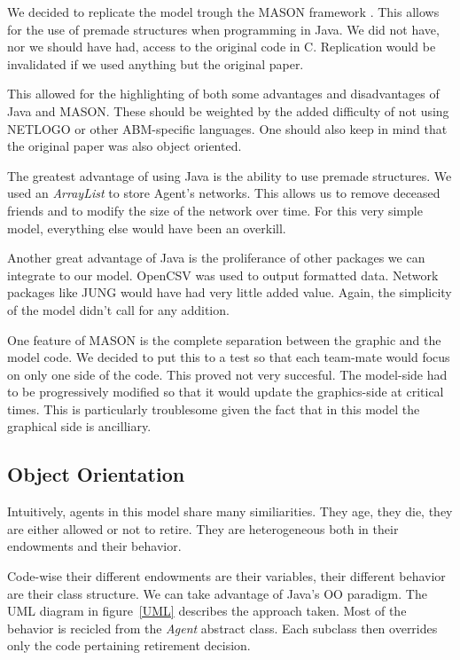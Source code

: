 \documentclass[runningheads,a4paper]{llncs}
\begin{document}
We decided to replicate the model trough the MASON framework \cite{luke2005mason}.
This allows for the use of premade structures when programming in Java.
We did not have, nor we should have had, access to the original code in C.
Replication would be invalidated if we used anything but the original paper.

This allowed for the highlighting of both some advantages and disadvantages of Java and MASON.
These should be weighted by the added difficulty of not using NETLOGO or other ABM-specific languages.
One should also keep in mind that the original paper was also object oriented.

The greatest advantage of using Java is the ability to use premade structures.
We used an \textit{ArrayList} to store Agent's networks.
This allows us to remove deceased friends and to modify the size of the network over time.
For this very simple model, everything else would have been an overkill.

Another great advantage of Java is the proliferance of other packages we can integrate to our model.
OpenCSV was used to output formatted data.
Network packages like JUNG would have had very little added value.
Again, the simplicity of the model didn't call for any addition.

One feature of MASON is the complete separation between the graphic and the model code.
We decided to put this to a test so that each team-mate would focus on only one side of the code.
This proved not very succesful.
The model-side had to be progressively modified so that it would update the graphics-side at critical times.
This is particularly troublesome given the fact that in this model the graphical side is ancilliary.

\subsection{Object Orientation}

Intuitively, agents in this model share many similiarities.
They age, they die, they are either allowed or not to retire.
They are heterogeneous both in their endowments and their behavior.

Code-wise their different endowments are their variables, their different behavior are their class structure.
We can take advantage of Java's OO paradigm.
The UML diagram in figure~\ref{UML} describes the approach taken.
Most of the behavior is recicled from the \textit{Agent} abstract class.
Each subclass then overrides only the code pertaining retirement decision.
\end{document}
